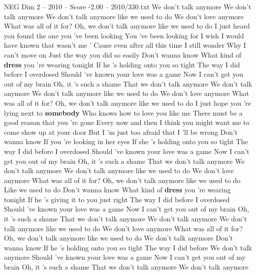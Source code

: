 \begin{textsample}{NEG Dim 2 – 2010 – Score -2.00 – 2010/330.txt}  \label{ex:f2_neg_018}
We don't talk anymore We don't talk anymore We don't talk anymore like we used to do We don't love anymore What was all of it for?
Oh, we don't talk anymore like we used to do I just heard you found the one you 've been looking You 've been looking for I wish I would have known that wasn't me ' Cause even after all this time I still wonder Why I can't move on Just the way you did so easily Don't wanna know What kind of \textbf{dress} you 're wearing tonight If he 's holding onto you so tight The way I did before I overdosed Should 've known your love was a game Now I can't get you out of my brain Oh, it 's such a shame That we don't talk anymore We don't talk anymore We don't talk anymore like we used to do We don't love anymore What was all of it for?
Oh, we don't talk anymore like we used to do I just hope you 're lying next to \textbf{somebody} Who knows how to love you like me There must be a good reason that you 're gone Every now and then I think you might want me to come show up at your door But I 'm just too afraid that I 'll be wrong Don't wanna know If you 're looking in her eyes If she 's holding onto you so tight The way I did before I overdosed Should 've known your love was a game Now I can't get you out of my brain Oh, it 's such a shame That we don't talk anymore We don't talk anymore We don't talk anymore like we used to do We don't love anymore What was all of it for?
Oh, we don't talk anymore like we used to do Like we used to do Don't wanna know What kind of \textbf{dress} you 're wearing tonight If he 's giving it to you just right The way I did before I overdosed Should 've known your love was a game Now I can't get you out of my brain Oh, it 's such a shame That we don't talk anymore We don't talk anymore We don't talk anymore like we used to do We don't love anymore What was all of it for?
Oh, we don't talk anymore like we used to do We don't talk anymore Don't wanna know If he 's holding onto you so tight The way I did before We don't talk anymore Should 've known your love was a game Now I can't get you out of my brain Oh, it 's such a shame That we don't talk anymore We don't talk anymore

\end{textsample}
